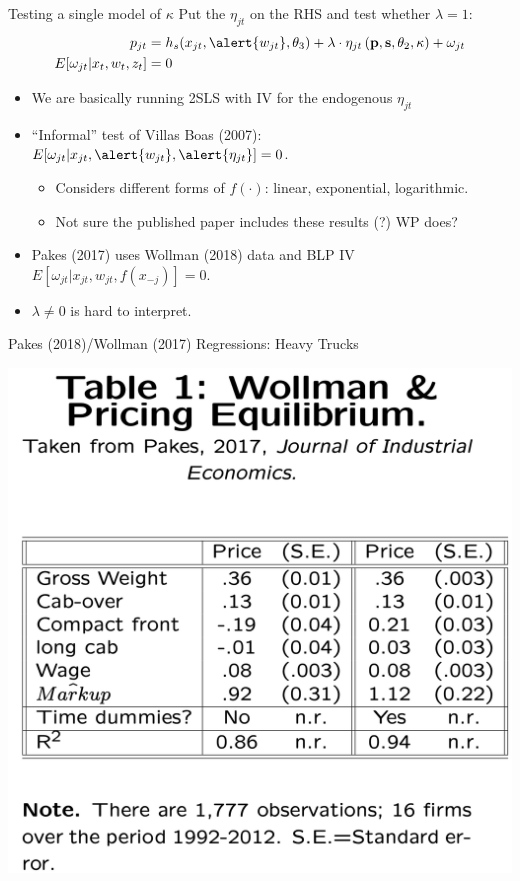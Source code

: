 \documentclass[xcolor=pdftex,dvipsnames,table,mathserif,aspectratio=169]{beamer}
\begin{document}
\begin{frame}{Testing a single model of $\kappa$}
Put the $\eta_{jt}$ on the RHS and test whether $\lambda=1$:
\begin{align*}
 p_{jt} &= h_s(x_{jt}, \alert{w_{jt}},\theta_3) + \lambda \cdot \eta_{jt}\left(\mathbf{p},\mathbf{s},\theta_2,\kappa \right)+  \omega_{jt}\\
 E[\omega_{jt} | x_{t},w_{t},z_{t}]&=0
\end{align*}
\begin{itemize}
\item We are basically running 2SLS with IV for the endogenous $\eta_{jt}$
\item ``Informal'' test of Villas Boas (2007): $E[\omega_{jt} | x_{jt},\alert{w_{jt}},\alert{\eta_{jt}}]=0$.
\begin{itemize}
\item Considers different forms of $f(\cdot)$: linear, exponential, logarithmic.
\item Not sure the published paper includes these results (?) WP does?
  \end{itemize}
\item Pakes (2017) uses Wollman (2018) data and BLP IV $E[\omega_{jt} | x_{jt},w_{jt},f(x_{-j})]=0$.
\item $\lambda \neq 0$ is hard to interpret.
\end{itemize}
\end{frame}


\begin{frame}{Pakes (2018)/Wollman (2017) Regressions: Heavy Trucks}
\begin{center}
\includegraphics[height=0.9\textheight]{./resources/wollman_regression.png}
\end{center}
\end{frame}
\end{document}
